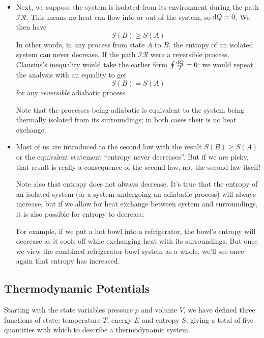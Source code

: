 \documentclass[11pt, a4paper]{article}
\newcommand{\dbar}{{\mathchar '26\mkern -11mu \mathrm{d}}} %
\begin{document}
\begin{itemize}
	
	\item Next, we suppose the system is isolated from its environment during the path $ \mathcal{IR} $. This means no heat can flow into or out of the system, so $ \dbar Q = 0 $. We then have
	\begin{equation*}
		S(B) \geq S(A)
	\end{equation*}
	In other words, in any process from state $ A $ to $ B $, the entropy of an isolated system can never decrease. If the path $ \mathcal{IR} $ were a reversible process, Clausius's inequality would take the earlier form $ \oint \frac{\dbar Q}{T} = 0 $; we would repeat the analysis with an equality to get
	\begin{equation*}
		S(B) = S(A)
	\end{equation*}
	for any \textit{reversible} adiabatic process. 
	
	Note that the processes being adiabatic is equivalent to the system being thermally isolated from its surroundings; in both cases their is no heat exchange.
	
	\item Most of us are introduced to the second law with the result $ S(B) \geq S(A) $ or the equivalent statement ``entropy never decreases''. But if we are picky, that result is really a consequence of the second law, not the second law itself!
	
	Note also that entropy does not always decrease. It's true that the entropy of an isolated system (or a system undergoing an adiabatic process) will always increase, but if we allow for heat exchange between system and surroundings, it is also possible for entropy to decrease.
	
	For example, if we put a hot bowl into a refrigerator, the bowl's entropy will decrease as it cools off while exchanging heat with its surroundings. But once we view the combined refrigerator-bowl system as a whole, we'll see once again that entropy has increased.
	
\end{itemize}


\subsection{Thermodynamic Potentials}
Starting with the state variables pressure $ p $ and volume $ V $, we have defined three functions of state: temperature $ T $, energy $ E $ and entropy $ S $, giving a total of five quantities with which to describe a thermodynamic system. 
\end{document}
